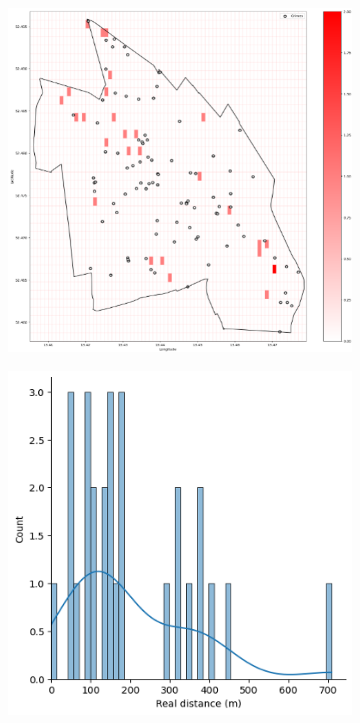 \begin{figure}[h]
    \centering
    \begin{subfigure}[b]{0.45\textwidth}
        \centering
        \includegraphics[width=\textwidth]{./figures/Gerard/Accomodation.png}
        \caption{}
        \label{fig:image1}
    \end{subfigure}
    \hfill
    \begin{subfigure}[b]{0.45\textwidth}
        \centering
        \includegraphics[width=\textwidth]{./figures/Gerard/Accomodatioon_1.png}
        \caption{}
        \label{fig:image2}
    \end{subfigure}
\end{figure}

